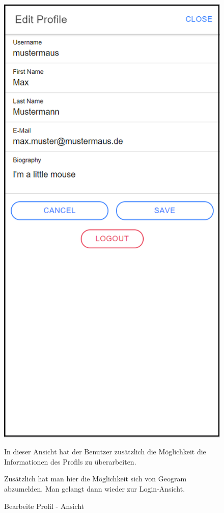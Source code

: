 \begin{figure}[H]
    \centering
    \begin{minipage}{.4\textwidth}
        \begin{center}
            \includegraphics[width=0.8\linewidth]{images/editProfil.png}
        \end{center}
        \caption{Bearbeite Profil - Ansicht}
        \label{fig:editprofil}
    \end{minipage}%
    \begin{minipage}{.6\textwidth}
        \begin{changemargin}{0.5cm}{0cm}            
            In dieser Ansicht hat der Benutzer zusätzlich die Möglichkeit die Informationen des Profils zu überarbeiten.

            Zusätzlich hat man hier die Möglichkeit sich von Geogram abzumelden. Man gelangt dann wieder zur Login-Ansicht.
        \end{changemargin}
    \end{minipage}
\end{figure}
